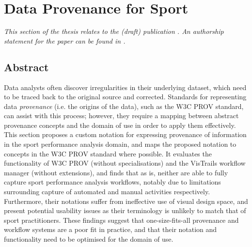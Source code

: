 \vspace{-0.3cm}

\section{Data Provenance for Sport} \label{sec:simmons2018dataprov}


\vspace{-0.6cm}

\textit{This section of the thesis relates to the (draft) publication . An authorship statement for the paper can be found in .}

\vspace{-0.4cm}

\subsection{Abstract}

Data analysts often discover irregularities in their underlying dataset, which need to be traced back to the original source and corrected. Standards for representing data \textit{provenance} (i.e. the origins of the data), such as the W3C PROV standard, can assist with this process; however, they require a mapping between abstract provenance concepts and the domain of use in order to apply them effectively. This section proposes a custom notation for expressing provenance of information in the sport performance analysis domain, and maps the proposed notation to concepts in the W3C PROV standard where possible. It evaluates the functionality of W3C PROV (without specialisations) and the VisTrails workflow manager (without extensions), and finds that as is, neither are able to fully capture sport performance analysis workflows, notably due to limitations surrounding capture of automated and manual activities respectively. Furthermore, their notations suffer from ineffective use of visual design space, and present potential usability issues as their terminology is unlikely to match that of sport practitioners. These findings suggest that one-size-fits-all provenance and workflow systems are a poor fit in practice, and that their notation and functionality need to be optimised for the domain of use.

